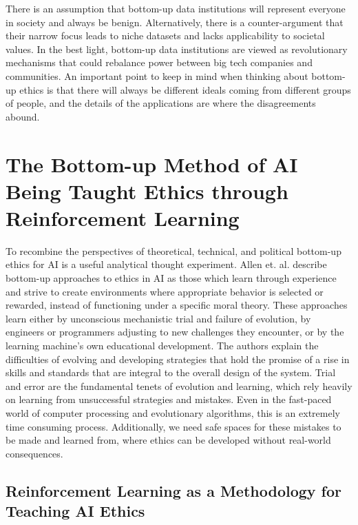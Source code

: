\documentclass{svproc}
\begin{document}
There is an assumption that bottom-up data institutions will represent everyone in society and always be benign. Alternatively, there is a counter-argument that their narrow focus leads to niche datasets and lacks applicability to societal values. In the best light, bottom-up data institutions are viewed as revolutionary mechanisms that could rebalance power between big tech companies and communities. \cite{ExperimentalismDocs.}  An important point to keep in mind when thinking about bottom-up ethics is that there will always be different ideals coming from different groups of people, and the details of the applications are where the disagreements abound. 

\section{The Bottom-up Method of AI Being Taught Ethics through Reinforcement Learning }

To recombine the perspectives of theoretical, technical, and political bottom-up ethics for AI is a useful analytical thought experiment. Allen et. al. \cite{Allen2005ArtificialApproaches} describe bottom-up approaches to ethics in AI as those which learn through experience and strive to create environments where appropriate behavior is selected or rewarded, instead of functioning under a specific moral theory. These approaches learn either by unconscious mechanistic trial and failure of evolution, by engineers or programmers adjusting to new challenges they encounter, or by the learning machine’s own educational development. \cite{Allen2005ArtificialApproaches} The authors explain the difficulties of evolving and developing strategies that hold the promise of a rise in skills and standards that are integral to the overall design of the system. Trial and error are the fundamental tenets of evolution and learning, which rely heavily on learning from unsuccessful strategies and mistakes. Even in the fast-paced world of computer processing and evolutionary algorithms, this is an extremely time consuming process. Additionally, we need safe spaces for these mistakes to be made and learned from, where ethics can be developed without real-world consequences. 

\subsection{Reinforcement Learning as a Methodology for Teaching AI Ethics
}
\end{document}
